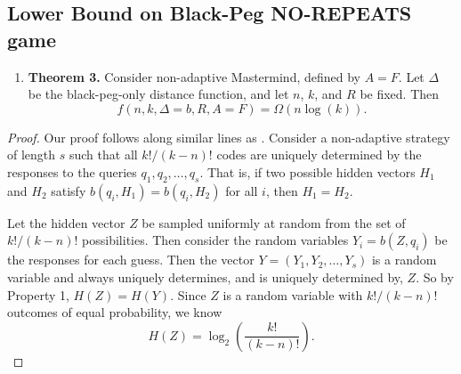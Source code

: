 \documentclass[12pt, a4paper]{article}
\begin{document}
\subsection{Lower Bound on Black-Peg NO-REPEATS game}
\begin{enumerate}[label=]
	\item\textbf{Theorem 3.} Consider non-adaptive Mastermind, defined by $A=F$. Let $\Delta$ be the black-peg-only distance function, and let $n$, $k$, and $R$ be fixed. Then
	\begin{equation*}
	f(n, k, \Delta = b, R, A=F)= \Omega( n\log(k)).
	\end{equation*}
\end{enumerate}

\begin{proof}
	Our proof follows along similar lines as \cite{DS13}. Consider a non-adaptive strategy of length $s$ such that all
	$k!/(k-n)!$ codes are uniquely determined by the responses to the queries $q_1, q_2, \ldots, q_s$. That is, if two possible hidden vectors $H_1$ and $H_2$ satisfy $b(q_i, H_1) = b(q_i, H_2)$ for all $i$, then $H_1 = H_2$.
	
	Let the hidden vector $Z$ be sampled uniformly at random from the set of $k!/(k-n)!$ possibilities. Then
	consider the random variables $Y_i = b(Z, q_i)$ be the responses for each guess.
	Then the vector $Y = (Y_1,Y_2,\ldots,Y_s)$ is a random variable and always uniquely determines, and is uniquely
	determined by, $Z$. So by Property 1, $H(Z) = H(Y)$. Since $Z$ is a random
	variable with $k!/(k-n)!$ outcomes of equal probability, we know
	\begin{equation}\label{equalEntropy}
	H(Z) = \log_2\left(\frac{k!}{(k-n)!}\right).
	\end{equation}
	

\end{proof}
\end{document}
